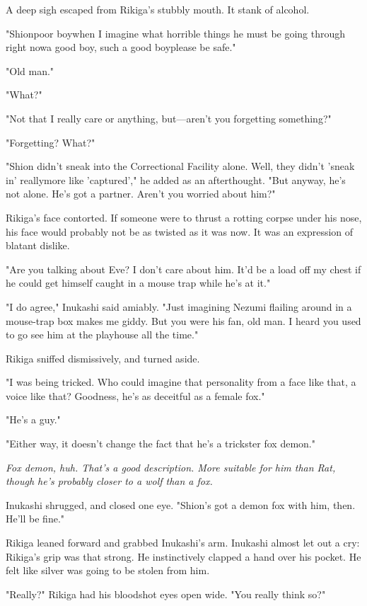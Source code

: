 A deep sigh escaped from Rikiga's stubbly mouth. It stank of alcohol.

"Shion\el poor boy\el when I imagine what horrible things he must be
going through right now\el a good boy, such a good boy\el please be
safe."

"Old man."

"What?"

"Not that I really care or anything, but---aren't you forgetting
something?"

"Forgetting? What?"

"Shion didn't sneak into the Correctional Facility alone. Well, they
didn't 'sneak in' really\el more like 'captured'," he added as an
afterthought. "But anyway, he's not alone. He's got a partner. Aren't
you worried about him?"

Rikiga's face contorted. If someone were to thrust a rotting corpse
under his nose, his face would probably not be as twisted as it was now.
It was an expression of blatant dislike.

"Are you talking about Eve? I don't care about him. It'd be a load off
my chest if he could get himself caught in a mouse trap while he's at
it."

"I do agree," Inukashi said amiably. "Just imagining Nezumi flailing
around in a mouse-trap box makes me giddy. But you were his fan, old
man. I heard you used to go see him at the playhouse all the time."

Rikiga sniffed dismissively, and turned aside.

"I was being tricked. Who could imagine that personality from a face
like that, a voice like that? Goodness, he's as deceitful as a female
fox."

"He's a guy."

"Either way, it doesn't change the fact that he's a trickster fox
demon."

\emph{Fox demon, huh. That's a good description. More suitable for him than
Rat, though he's probably closer to a wolf than a fox.}

Inukashi shrugged, and closed one eye. "Shion's got a demon fox with
him, then. He'll be fine."

Rikiga leaned forward and grabbed Inukashi's arm. Inukashi almost let
out a cry: Rikiga's grip was that strong. He instinctively clapped a
hand over his pocket. He felt like silver was going to be stolen from
him.

"Really?" Rikiga had his bloodshot eyes open wide. "You really think
so?"

